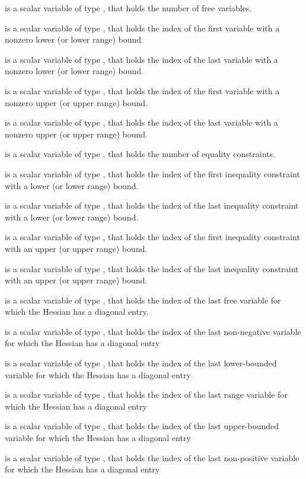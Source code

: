 \documentclass{galahad}
\begin{document}
\begin{description}
 is a scalar variable of type \integer, that holds the 
number of free variables. 
    
 is a scalar variable of type \integer, that holds the 
index of the first variable with a nonzero lower (or lower range) bound. 
    
 is a scalar variable of type \integer, that holds the 
index of the last variable with a nonzero lower (or lower range) bound. 
    
 is a scalar variable of type \integer, that holds the 
index of the first variable with a nonzero upper (or upper range) bound. 
    
 is a scalar variable of type \integer, that holds the 
index of the last variable with a nonzero upper (or upper range) bound. 
    
 is a scalar variable of type \integer, that holds the 
number of equality constraints. 
    
 is a scalar variable of type \integer, that holds the 
index of the first inequality constraint with a lower (or lower range) bound. 
    
 is a scalar variable of type \integer, that holds the 
index of the last inequality constraint with a lower (or lower range) bound. 
    
 is a scalar variable of type \integer, that holds the 
index of the first inequality constraint with an upper (or upper range) bound. 
    
 is a scalar variable of type \integer, that holds the 
index of the last inequality constraint with an upper (or upper range) bound. 
 
 is a scalar variable of type \integer, 
that holds the index of the last free variable for which the Hessian has a 
diagonal entry. 
 
 is a scalar variable of type \integer, 
that holds the index of the last non-negative variable for which 
the Hessian has a diagonal entry 
 
 is a scalar variable of type \integer, 
that holds the index of the last lower-bounded variable for which the Hessian 
has a diagonal entry 
 
 is a scalar variable of type \integer, 
that holds the index of the last range variable for which the Hessian has a 
diagonal entry 
 
 is a scalar variable of type \integer, 
that holds the index of the last upper-bounded variable for which the Hessian 
has a diagonal entry 
 
 is a scalar variable of type \integer, 
that holds the index of the last non-positive variable for which the Hessian 
has a diagonal entry 
\end{description}
\end{document}
